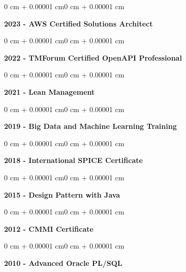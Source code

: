 \documentclass[10pt, letterpaper]{article}
\newenvironment{onecolentry}{
    \begin{adjustwidth}{0 cm + 0.00001 cm}{0 cm + 0.00001 cm}
}{
    \end{adjustwidth}}
\begin{document}
        \begin{onecolentry}
            \textbf{2023 - AWS Certified Solutions Architect}
        \end{onecolentry}
        \vspace{0.2 cm}

        \begin{onecolentry}
            \textbf{2022 - TMForum Certified OpenAPI Professional}
        \end{onecolentry}
        \vspace{0.2 cm}

        \begin{onecolentry}
            \textbf{2021 - Lean Management}
        \end{onecolentry}
        \vspace{0.2 cm}

        \begin{onecolentry}
            \textbf{2019 - Big Data and Machine Learning Training}
        \end{onecolentry}
        \vspace{0.2 cm}

        \begin{onecolentry}
            \textbf{2018 - International SPICE Certificate}
        \end{onecolentry}
        \vspace{0.2 cm}

        \begin{onecolentry}
            \textbf{2015 - Design Pattern with Java}
        \end{onecolentry}
        \vspace{0.2 cm}

        \begin{onecolentry}
            \textbf{2012 - CMMI Certificate}
        \end{onecolentry}
        \vspace{0.2 cm}

        \begin{onecolentry}
            \textbf{2010 - Advanced Oracle PL/SQL}
        \end{onecolentry}
        \vspace{0.2 cm}
\end{document}
